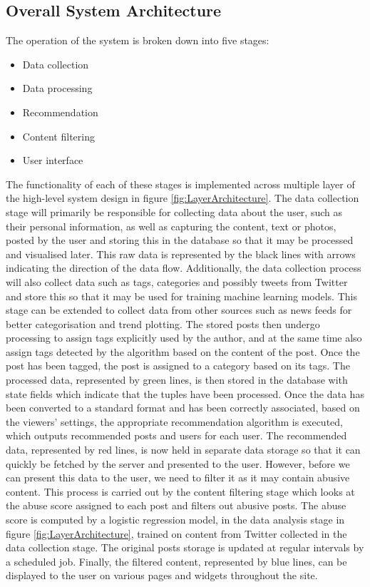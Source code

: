 \subsection{Overall System Architecture}
The operation of the system is broken down into five stages: 

\begin{itemize}
\item Data collection
\item Data processing
\item Recommendation
\item Content filtering 
\item User interface
\end{itemize}

The functionality of each of these stages is implemented across multiple layer of the high-level system design in figure \ref{fig:LayerArchitecture}. The data collection stage will primarily be responsible for collecting data about the user, such as their personal information, as well as capturing the content, text or photos, posted by the user and storing this in the database so that it may be processed and visualised later. This raw data is represented by the black lines with arrows indicating the direction of the data flow. Additionally, the data collection process will also collect data such as tags, categories and possibly tweets from Twitter and store this so that it may be used for training machine learning models. This stage can be extended to collect data from other sources such as news feeds for better categorisation and trend plotting. The stored posts then undergo processing to assign tags explicitly used by the author, and at the same time also assign tags detected by the algorithm based on the content of the post. Once the post has been tagged, the post is assigned to a category based on its tags. The processed data, represented by green lines, is then stored in the database with state fields which indicate that the tuples have been processed. Once the data has been converted to a standard format and has been correctly associated, based on the viewers' settings, the appropriate recommendation algorithm is executed, which outputs recommended posts and users for each user. The recommended data, represented by red lines, is now held in separate data storage so that it can quickly be fetched by the server and presented to the user. However, before we can present this data to the user, we need to filter it as it may contain abusive content. This process is carried out by the content filtering stage which looks at the abuse score assigned to each post and filters out abusive posts. The abuse score is computed by a logistic regression model, in the data analysis stage in figure \ref{fig:LayerArchitecture}, trained on content from Twitter collected in the data collection stage. The original posts storage is updated at regular intervals by a scheduled job. Finally, the filtered content, represented by blue lines, can be displayed to the user on various pages and widgets throughout the site. 

